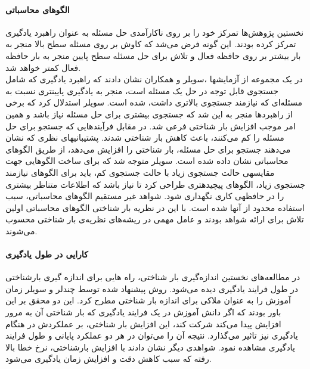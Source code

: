 \paragraph{الگوهای محاسباتی}
نخستین پژوهش‌ها تمرکز خود را بر روی ناکارآمدی حل مسئله به عنوان راهبرد یادگیری تمرکز کرده‌ بودند. این گونه فرض می‌شد که کاوش بر روی مسئله سطح بالا منجر به بار بیشتر بر روی حافظه فعال و تلاش برای حل مسئله سطح پایین منجر به بار حافظه فعال کمتر خواهد شد.
\cite{sweller2011measuring}
\\
در یک مجموعه از آزمایشها ،سویلر و همکاران نشان دادند كه راهبرد یادگيری كه شامل جستجوی
قابل توجه در حل یک مسئله است، منجر به یادگيری پایينتری نسبت به مسئله‌ای كه نيازمند جستجوی
بالاتری داشت،  شده  است. سویلر  استدلال  كرد  كه  برخی از  راهبردها منجر  به  این شد  كه  جستجوی
بيشتری برای حل  مسئله  نياز باشد  و  همين امر  موجب  افزایش بار شناختی  فرعی شد.  در  مقابل 
فرآیندهایی كه جستجو برای حل مسئله را كم می‌كنند، باعث كاهش بار شناختی شدند. پشتيبانیهای
نظری كه نشان می‌دهند جستجو برای حل مسئله، بار شناختی را افزایش می‌دهد، از طریق الگوهای 
محاسباتی نشان  داده  شده  است. سویلر  متوجه  شد  كه برای ساخت  الگوهایی جهت  مقایسهی حالت 
جستجوی زیاد با حالت جستجوی كم، باید برای الگوهای نيازمند جستجوی زیاد، الگوهای پيچيدهتری
طراحی كرد تا نياز باشد كه اطلاعات متناظر بيشتری را در حافظهی كاری نگهداری شود.
\cite{tarmizi1988guidance}
شواهد غیر مستقیم الگوهای محاسباتی، سبب استفاده محدود از آنها شده است. با این در نظریه بار شناختی الگوهای محاسباتی اولین تلاش برای ارائه شواهد بودند و عامل مهمی در ریشه‌های نظریه‌ی بار شناختی محسوب می‌شوند.
\cite{sweller2011measuring}
\paragraph{کارایی در طول یادگیری}
در مطالعه‌های نخستین اندازه‌گیری بار شناختی، راه هایی برای اندازه گیری بارشناختی در طول فرایند یادگیری دیده می‌شود.
\cite{sweller2011measuring}
روش پیشنهاد شده توسط چندلر و سویلر زمان آموزش را به عنوان ملاکی برای اندازه بار شناختی مطرح کرد. این دو محقق بر این باور بودند که اگر دانش آموزش در یک فرایند یادگیری که بار شناختی آن به مرور افزایش پیدا می‌کند شرکت کند، این افزایش بار شناختی، بر عملکردش در هنگام یادگیری نیز تاثیر می‌گذارد. نتیجه آن را می‌توان در هر دو عملکرد پایانی و طول فرایند یادگیری مشاهده نمود.
\cite{chandler1991cognitive}
شواهدی دیگر نشان دادند با افزایش بارشناختی، نرخ خطا بالا رفته که سبب کاهش دقت و افزایش زمان یادگیری می‌‌شود.


